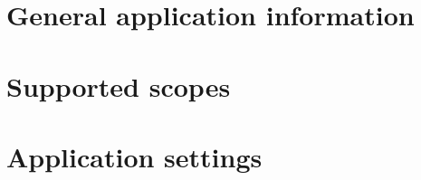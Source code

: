 \documentclass{article}
\begin{document}
    \section{General application information}
    \label{sec:general-application-information}
    

    \section{Supported scopes}
    \label{sec:supported-scopes}
    

    \section{Application settings}
    \label{sec:application-settings}
    
\end{document}
